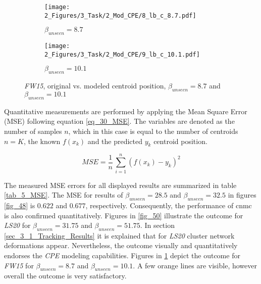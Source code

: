 \begin{figure}[!h]
    \begin{subfigure}{.5\textwidth}
        \centering
        \caption{$\beta_{unseen} = 8.7$}
        \texttt{[image: 2\_Figures/3\_Task/2\_Mod\_CPE/8\_lb\_c\_8.7.pdf]}
    \end{subfigure}%
    \hfill
    \begin{subfigure}{.5\textwidth}
        \centering
        \caption{$\beta_{unseen} = 10.1$ }
        \texttt{[image: 2\_Figures/3\_Task/2\_Mod\_CPE/9\_lb\_c\_10.1.pdf]}
    \end{subfigure}
    \vspace{-0.3cm}
    \caption{\emph{FW15}, original vs. modeled centroid position, $\beta_{unseen} = 8.7$ and $\beta_{unseen} = 10.1$}
    \label{fig_52}    
    
\end{figure}

Quantitative measurements are performed by applying the Mean Square Error (MSE) following equation \eqref{eq_30_MSE}. 
The variables are denoted as the number of samples $n$, which in this case is equal to the number of centroids $n = K$, the known $f(x_k)$ and the predicted $y_k$ centroid position.\newline

\begin{equation}
        MSE = \frac{1}{n} \, \sum_{i=1}^n \left(f(x_k) - y_k\right)^2
        \label{eq_30_MSE}
\end{equation}

The measured MSE errors for all displayed results are summarized in table \ref{tab_5_MSE}. 
The MSE for results of $\beta_{unseen} = 28.5$ and $\beta_{unseen} = 32.5$ in figures \ref{fig_48} is $0.622$ and $0.677$, respectively. 
Consequently, the performance of \gls{cnmc} is also confirmed quantitatively.
Figures in \ref{fig_50} illustrate the outcome for \emph{LS20} for $\beta_{unseen} = 31.75$ and $\beta_{unseen} = 51.75$.
In section \ref{sec_3_1_Tracking_Results} it is explained that for  \emph{LS20} cluster network deformations appear. 
Nevertheless, the outcome visually and quantitatively endorses the \emph{CPE} modeling capabilities.
Figures in \ref{fig_52}  depict the outcome for \emph{FW15} for $\beta_{unseen} = 8.7$ and $\beta_{unseen} = 10.1$.
A few orange lines are visible, however overall the outcome is very satisfactory.\newline

